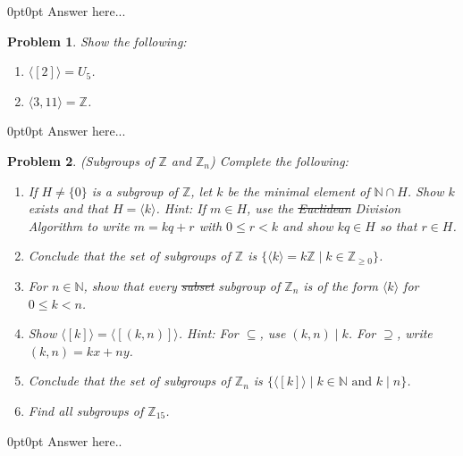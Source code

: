 \documentclass[12pt]{article}
\newtheorem{problem}{Problem}
\numberwithin{problem}{section} %
\theoremstyle{remark}  %
\newenvironment{answer}
    {\begin{adjustwidth}{0pt}{0pt}}
    {\end{adjustwidth}}
\begin{document}
    \begin{answer}
        Answer here...
    \end{answer}
    \begin{problem}
        Show the following:
        \begin{enumerate}[label=(\alph*)]
            \item $\langle[2]\rangle=U_5$.
            \item $\langle 3,11 \rangle = \mathbb{Z}$.
        \end{enumerate}
    \end{problem}
    \begin{answer}
        Answer here...
    \end{answer}
\setcounter{problem}{62}
    \begin{problem}
        (Subgroups of $\mathbb{Z}$ and $\mathbb{Z}_n$) Complete the following:
        \begin{enumerate}[label=(\alph*)]
            \item If $H\neq\{0\}$ is a subgroup of $\mathbb{Z}$, let $k$ be the minimal element of $\mathbb{N}\cap H$. Show $k$ exists and that $H=\langle k\rangle$. Hint: If $m\in H$, use the \st{Euclidean} Division Algorithm to write $m=kq+r$ with $0\leq r < k$ and show $kq\in H$ so that $r \in H$.
            \item Conclude that the set of subgroups of $\mathbb{Z}$ is $\{\langle k\rangle=k\mathbb{Z} \mid k\in\mathbb{Z}_{\geq 0}\}$.
            \item For $n\in \mathbb{N}$, show that every \st{subset} subgroup of $\mathbb{Z}_n$ is of the form $\langle k \rangle$ for $0 \leq k < n$.
            \item Show $\langle [k] \rangle = \langle [(k,n)] \rangle$. Hint: For $\subseteq$, use $(k,n)\operatorname{\mid} k$. For $\supseteq$, write $(k,n)=kx+ny$.
            \item Conclude that the set of subgroups of $\mathbb{Z}_n$ is $\{\langle [k] \rangle \mid k \in \mathbb{N}\text{ and } k\mid n\}$.
            \item Find all subgroups of $\mathbb{Z}_{15}$.
        \end{enumerate}
    \end{problem}
    \begin{answer}
        Answer here..
    \end{answer}
\end{document}
